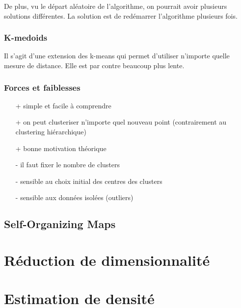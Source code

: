 		De plus, vu le départ aléatoire de l'algorithme, on pourrait avoir plusieurs solutions différentes. La solution est de redémarrer l'algorithme plusieurs fois.
		
		\subsubsection{K-medoids}
		
		Il s'agit d'une extension des k-means qui permet d'utiliser n'importe quelle mesure de distance. Elle est par contre beaucoup plus lente.
		
		
		\subsubsection{Forces et faiblesses}
		
		\begin{itemize}
			\item[+] simple et facile à comprendre
			\item[+] on peut clusteriser n'importe quel nouveau point (contrairement au clustering hiérarchique)
			\item[+] bonne motivation théorique
			\item[-] il faut fixer le nombre de clusters
			\item[-] sensible au choix initial des centres des clusters
			\item[-] sensible aux données isolées (outliers)
		\end{itemize}
	
	\subsection{Self-Organizing Maps}
	

\section{Réduction de dimensionnalité}

\section{Estimation de densité}